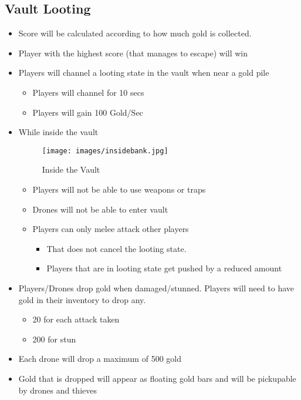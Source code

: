 \documentclass[10pt]{report}
\begin{document}
\subsection{Vault Looting}

\begin{itemize}
    \item Score will be calculated according to how much gold is collected.
    \item Player with the highest score (that manages to escape) will win
    \item Players will channel a looting state in the vault when near a gold pile 
    \begin{itemize}
        \item Players will channel for 10 secs
        \item Players will gain 100 Gold/Sec
    \end{itemize}
    \item While inside the vault
    \begin{figure}[H]
        \centering
        \texttt{[image: images/insidebank.jpg]}
        \caption{Inside the Vault}
    \end{figure}
    \begin{itemize}
        \item Players will not be able to use weapons or traps
        \item Drones will not be able to enter vault
        \item Players can only melee attack other players 
        \begin{itemize}
            \item That does not cancel the looting state.
            \item Players that are in looting state get pushed by a reduced amount
        \end{itemize}
    \end{itemize}
    \item Players/Drones drop gold when damaged/stunned. Players will need to have gold in their inventory to drop any.
    \begin{itemize}
        \item 20  for each attack taken
        \item 200 for stun
    \end{itemize}
    \item Each drone will drop a maximum of 500 gold
    \item Gold that is dropped will appear as floating gold bars and will be pickupable by drones and thieves     
\end{itemize}
\end{document}
